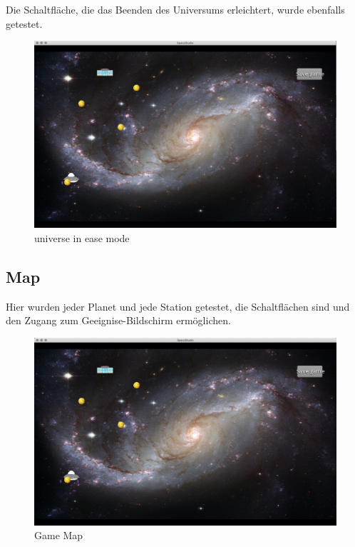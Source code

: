 \documentclass[12pt]{article}
\begin{document}
Die Schaltfläche, die das Beenden des Universums erleichtert, wurde ebenfalls getestet.\\

\begin{figure}[t]
\centering
\includegraphics[scale=0.3]{TestProtocolBilder/universeEase.png}
\caption{universe in ease mode}
\end{figure}

\newpage
\subsection{Map}

Hier wurden jeder Planet und jede Station getestet, die Schaltflächen sind und den Zugang zum Geeignise-Bildschirm ermöglichen.\\
\begin{figure}
\centering
\includegraphics[scale=0.3]{TestProtocolBilder/map.png}
\caption{Game Map}
\end{figure}
\newpage
\end{document}
